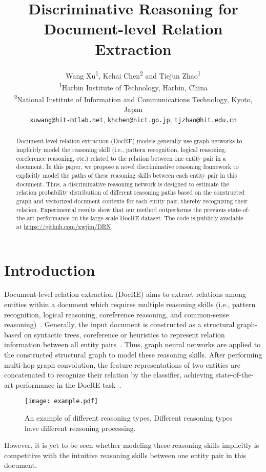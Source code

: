 \documentclass[11pt,a4paper]{article}
\title{Discriminative Reasoning for Document-level Relation Extraction}
\author{Wang Xu\textsuperscript{\rm 1}, Kehai Chen\textsuperscript{\rm 2} and Tiejun Zhao\textsuperscript{\rm 1} \\
  \textsuperscript{\rm 1}Harbin Institute of Technology, Harbin, China \\
  \textsuperscript{\rm 2}National Institute of Information and Communications Technology, Kyoto, Japan \\
  \texttt{xuwang@hit-mtlab.net}, \texttt{khchen@nict.go.jp}, \texttt{tjzhao@hit.edu.cn}  \\}
\date{}
\begin{document}
\maketitle
\begin{abstract}
Document-level relation extraction (DocRE) models generally use graph networks to implicitly model the reasoning skill (i.e., pattern recognition, logical reasoning, coreference reasoning, etc.) related to the relation between one entity pair in a document.
In this paper, we propose a novel discriminative reasoning framework to explicitly model the paths of these reasoning skills between each entity pair in this document.
Thus, a discriminative reasoning network is designed to estimate the relation probability distribution of different reasoning paths based on the constructed graph and vectorized document contexts for each entity pair, thereby recognizing their relation.
Experimental results show that our method outperforms the previous state-of-the-art performance on the large-scale DocRE dataset.
The code is publicly available at \url{https://github.com/xwjim/DRN}.
\end{abstract}

\section{Introduction}
\label{sec1}
Document-level relation extraction (DocRE) aims to extract relations among entities within a document which requires multiple reasoning skills (i.e., pattern recognition, logical reasoning, coreference reasoning, and common-sense reasoning)~\cite{yao-etal-2019-docred}.
Generally, the input document is constructed as a structural graph-based on syntactic trees, coreference or heuristics to represent relation information between all entity pairs~\cite{Nan2020ReasoningWL,zeng-etal-2020-double,docred-rec}.
Thus, graph neural networks are applied to the constructed structural graph to model these reasoning skills.
After performing multi-hop graph convolution, the feature representations of two entities are concatenated to recognize their relation by the classifier, achieving state-of-the-art performance in the DocRE  task~\cite{zeng-etal-2020-double,docred-rec}.
\begin{figure}[t]
  \centering
  \texttt{[image: example.pdf]}
  \caption{An example of different reasoning types. Different reasoning types have different reasoning processing.}
  \label{fig1:example}
\end{figure}
However, it is yet to be seen whether modeling these reasoning skills implicitly is competitive with the intuitive reasoning skills between one entity pair in this document.
\end{document}
